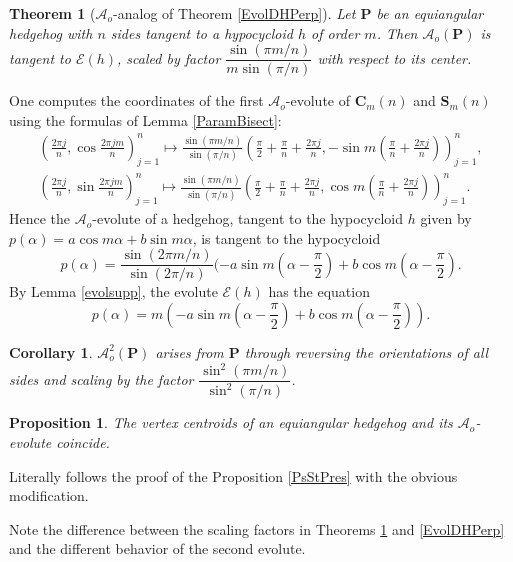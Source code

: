 \documentclass[12pt]{article}
\makeatletter
\newtheorem{proposition}[lemma]{Proposition}
\newtheorem{theorem}{Theorem}
\newtheorem{corollary}[lemma]{Corollary}
\renewenvironment{proof}[1][\proofname] 
{\par\pushQED{\qed}\normalfont\topsep6\p@\@plus6\p@\relax\trivlist\item[\hskip\labelsep\bfseries#1\@addpunct{.}]\ignorespaces}{\popQED\endtrivlist\@endpefalse}
\newcommand{\Aeo}{\mathcal{A}_o}
\newcommand{\E}{\mathcal{E}}
\renewcommand{\P}{\mathbf{P}}
\makeatother
\begin{document}
\begin{theorem}[$\Aeo$-analog of  Theorem \ref{EvolDHPerp}]
\label{EvolDH}
Let $\P$ be an equiangular hedgehog with $n$ sides tangent to a hypocycloid $h$ of order $m$. Then $\Aeo(\P)$ is tangent to $\E(h)$, scaled by  factor $\dfrac{\sin(\pi m/n)}{m\sin(\pi/n)}$ with respect to its center.
\end{theorem}
\begin{proof}
One computes the coordinates of the first $\Aeo$-evolute of $\mathbf{C}_m(n)$ and $\mathbf{S}_m(n)$ using  the formulas of Lemma \ref{ParamBisect}:
\begin{gather*}
\left(\frac{2\pi  j}n, \cos  \frac{2\pi j m}n \right)_{j=1}^n \mapsto 
\frac{\sin(\pi m/n)}{\sin(\pi/n)} \left( \frac{\pi}2 + \frac{\pi}n + \frac{2\pi j}n, -\sin m \left( \frac{\pi}n + \frac{2\pi j}n \right) \right)_{j=1}^n,\\
\left(\frac{2\pi j}n, \sin  \frac{2\pi j m}n \right)_{j=1}^n \mapsto \frac{\sin(\pi m/n)}{\sin(\pi/n)} \left( \frac{\pi}2 + \frac{\pi}n + \frac{2\pi j}n, \cos m \left( \frac{\pi}n + \frac{2\pi j}n \right) \right)_{j=1}^n.
\end{gather*}
Hence the $\Aeo$-evolute of a hedgehog, tangent to the hypocycloid $h$ given by $p(\alpha) = a\cos m\alpha + b\sin m\alpha$, is tangent to the hypocycloid
\[ p(\alpha) = \frac{\sin(2\pi m/n)}{\sin(2\pi/n)} (-a\sin m(\alpha - \frac{\pi}2) + b\cos m(\alpha - \frac{\pi}2). \]
By Lemma \ref{evolsupp}, the evolute  $\E(h)$ has the equation$$p(\alpha) = m\left(-a\sin m\left(\alpha - \dfrac{\pi}2\right) + b\cos m\left(\alpha - \dfrac{\pi}2\right)\right).$$
\end{proof}
\begin{corollary} \label{scalingfactor}
$\Aeo^2(\P)$ arises from $\P$ through reversing the orientations of all sides and scaling by the factor $\dfrac{\sin^2(\pi m/n)}{\sin^2(\pi/n)}$.
\end{corollary}

\begin{proposition}
\label{PSPres_A}
The vertex centroids of an equiangular hedgehog and its $\Aeo$-evolute coincide.
\end{proposition}
\begin{proof}
Literally follows the proof of the Proposition \ref{PsStPres} with the obvious modification.
\end{proof}

Note the difference between the scaling factors in Theorems \ref{EvolDH} and \ref{EvolDHPerp} and the different behavior of the second evolute.
\end{document}
